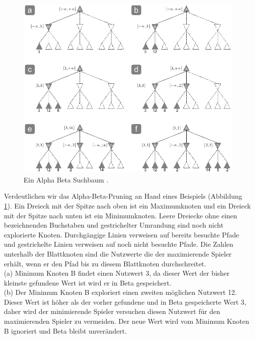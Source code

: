 \begin{figure}[!htbp]
  \centering
  \includegraphics[scale = 0.8]{inhalt/abbildungen/alpha_beta_suchbaum.pdf}
  \caption{Ein Alpha Beta Suchbaum \cite[213]{Russell}.}
  \label{fig:minimax_tictactoe}
\end{figure} 

Verdeutlichen wir das Alpha-Beta-Pruning an Hand eines Beispiels (Abbildung \ref{fig:minimax_tictactoe}). Ein Dreieck mit der Spitze nach oben ist ein Maximumknoten und ein Dreieck mit der Spitze nach unten ist ein Minimumknoten. Leere Dreiecke ohne einen bezeichnenden Buchstaben und gestrichelter Umrandung sind noch nicht explorierte Knoten. Durchgängige Linien verweisen auf bereits besuchte Pfade und gestrichelte Linien verweisen auf noch nicht besuchte Pfade. Die Zahlen unterhalb der Blattknoten sind die Nutzwerte die der maximierende Spieler erhält, wenn er den Pfad bis zu diesem Blattknoten durchschreitet. \\

(a) Minimum Knoten B findet einen Nutzwert 3, da dieser Wert der bisher kleinste gefundene Wert ist wird er in Beta gespeichert. \\

(b) Der Minimum Knoten B exploriert einen zweiten möglichen Nutzwert 12. Dieser Wert ist höher als der vorher gefundene und in Beta gespeicherte Wert 3, daher wird der minimierende Spieler versuchen diesen Nutzwert für den maximierenden Spieler zu vermeiden. Der neue Wert wird vom Minimum Knoten B ignoriert und Beta bleibt unverändert. \\

